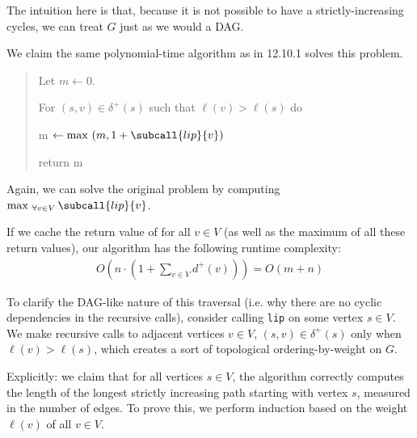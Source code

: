 \documentclass{article}
\begin{document}
\begin{solution}
The intuition here is that, because it is not possible to have a strictly-increasing cycles, we can treat $G$ just as we would a DAG.

We claim the same polynomial-time algorithm as in 12.10.1 solves this problem.

\begin{quote}%


\begin{steps}
  \item Let $m \leftarrow 0$.
  \item For $(s,v)\in \delta^+(s)$ such that $\ell(v) > \ell(s)$ do
    \begin{steps}
        \item m $\leftarrow \max \ (m, 1 + \subcall{lip}{v})$
    \end{steps}
  \item return m
\end{steps}
\end{quote}

Again, we can solve the original problem by computing \(\max_{ \ \forall v\in V}\subcall{lip}{v}\).

\begin{subproof}[Runtime]
If we cache the return value of  for all $v \in V$ (as well as the maximum of all these return values), our algorithm has the following runtime complexity:
\begin{align*}
    O \left( n \cdot \left( 1+\sum_{v\in V} d^+(v) \right) \right) = O \left( m+n \right)
\end{align*}
\end{subproof}

\begin{subproof}[Correctness]
To clarify the DAG-like nature of this traversal (i.e. why there are no cyclic dependencies in the recursive calls), consider calling \texttt{lip} on some vertex $s \in V$. We make recursive calls to adjacent vertices $v \in V$, $(s,v) \in \delta^{+}(s)$ only when $\ell(v) > \ell(s)$, which creates a sort of topological ordering-by-weight on $G$.

Explicitly: we claim that for all vertices $s \in V$, the algorithm correctly computes the length of the longest strictly increasing path starting with vertex $s$, measured in the number of edges. To prove this, we perform induction based on the weight $\ell(v)$ of all $v \in V$.


\end{subproof}
\end{solution}
\end{document}
